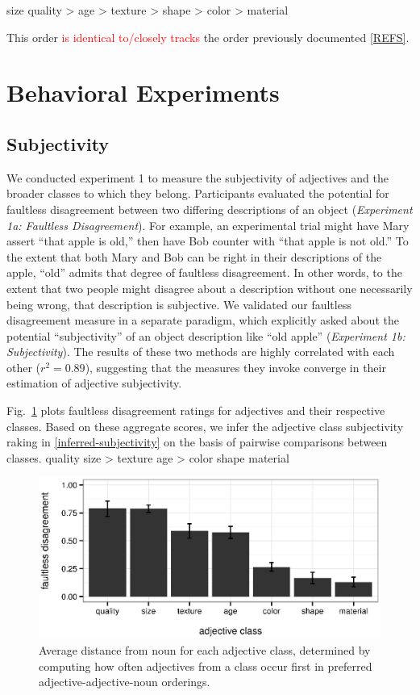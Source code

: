 \documentclass{pnastwo}
\newcommand{\red}[1]{\textcolor{Red}{#1}}
\begin{document}
\begin{article}
\be size \geq quality > age > texture > shape > color > material \label{inferred-order-preferences}\ee

This order \red{is identical to/closely tracks} the order previously documented \ref{REFS}.

\section{Behavioral Experiments}
	
\subsection{Subjectivity} We conducted experiment 1 to measure the subjectivity of adjectives and the broader classes to which they belong. Participants evaluated the potential for faultless disagreement between two differing descriptions of an object (\emph{Experiment 1a: Faultless Disagreement}). For example, an experimental trial might have Mary assert ``that apple is old,'' then have Bob counter with ``that apple is not old.'' To the extent that both Mary and Bob can be right in their descriptions of the apple, ``old'' admits that degree of faultless disagreement. In other words, to the extent that two people might disagree about a description without one necessarily being wrong, that description is subjective. We validated our faultless disagreement measure in a separate paradigm, which explicitly asked about the potential ``subjectivity'' of an object description like ``old apple'' (\emph{Experiment 1b: Subjectivity}). The results of these two methods are highly correlated with each other ($r^{2} = 0.89$), suggesting that the measures they invoke converge in their estimation of adjective subjectivity.

Fig.~\ref{faultless-class} plots faultless disagreement ratings for adjectives and their respective classes. Based on these aggregate scores, we infer the adjective class subjectivity raking in \ref{inferred-subjectivity} on the basis of pairwise comparisons between classes.
\be quality \geq size > texture \geq age > color \geq shape \geq material \label{inferred-subjectivity}\ee

\begin{figure}[h]
	\centering
	\includegraphics[width=.95\linewidth]{plots/faultless_class_plot.eps}
	\caption{Average distance from noun for each adjective class, determined by computing how often adjectives from a class occur first in preferred adjective-adjective-noun orderings.}\label{faultless-class}
\end{figure}





\end{article}
\end{document}
